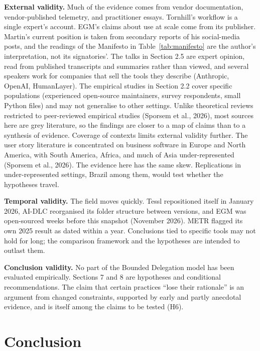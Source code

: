 \documentclass[11pt]{article}
\begin{document}
\textbf{External validity.} Much of the evidence comes from vendor documentation, vendor-published telemetry, and practitioner essays. Tornhill's workflow is a single expert's account. EGM's claims about use at scale come from its publisher. Martin's current position is taken from secondary reports of his social-media posts, and the readings of the Manifesto in Table~\ref{tab:manifesto} are the author's interpretation, not its signatories'. The talks in Section 2.5 are expert opinion, read from published transcripts and summaries rather than viewed, and several speakers work for companies that sell the tools they describe (Anthropic, OpenAI, HumanLayer). The empirical studies in Section 2.2 cover specific populations (experienced open-source maintainers, survey respondents, small Python files) and may not generalise to other settings. Unlike theoretical reviews restricted to peer-reviewed empirical studies (Sporsem et al., 2026), most sources here are grey literature, so the findings are closer to a map of claims than to a synthesis of evidence. Coverage of contexts limits external validity further. The user story literature is concentrated on business software in Europe and North America, with South America, Africa, and much of Asia under-represented (Sporsem et al., 2026). The evidence here has the same skew. Replications in under-represented settings, Brazil among them, would test whether the hypotheses travel.

\textbf{Temporal validity.} The field moves quickly. Tessl repositioned itself in January 2026, AI-DLC reorganised its folder structure between versions, and EGM was open-sourced weeks before this snapshot (November 2026). METR flagged its own 2025 result as dated within a year. Conclusions tied to specific tools may not hold for long; the comparison framework and the hypotheses are intended to outlast them.

\textbf{Conclusion validity.} No part of the Bounded Delegation model has been evaluated empirically. Sections 7 and 8 are hypotheses and conditional recommendations. The claim that certain practices ``lose their rationale'' is an argument from changed constraints, supported by early and partly anecdotal evidence, and is itself among the claims to be tested (H6).

\section{Conclusion}
\end{document}
